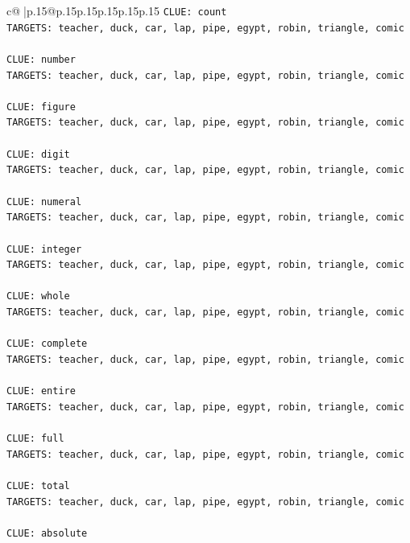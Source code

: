 \documentclass{article}
\begin{document}
{\begin{supertabular}{c@{$\;$}|p{.15\linewidth}@{}p{.15\linewidth}p{.15\linewidth}p{.15\linewidth}p{.15\linewidth}p{.15\linewidth}}
{{{\texttt{CLUE: count} \\
\texttt{TARGETS: teacher, duck, car, lap, pipe, egypt, robin, triangle, comic} \\
\\ 
\texttt{CLUE: number} \\
\texttt{TARGETS: teacher, duck, car, lap, pipe, egypt, robin, triangle, comic} \\
\\ 
\texttt{CLUE: figure} \\
\texttt{TARGETS: teacher, duck, car, lap, pipe, egypt, robin, triangle, comic} \\
\\ 
\texttt{CLUE: digit} \\
\texttt{TARGETS: teacher, duck, car, lap, pipe, egypt, robin, triangle, comic} \\
\\ 
\texttt{CLUE: numeral} \\
\texttt{TARGETS: teacher, duck, car, lap, pipe, egypt, robin, triangle, comic} \\
\\ 
\texttt{CLUE: integer} \\
\texttt{TARGETS: teacher, duck, car, lap, pipe, egypt, robin, triangle, comic} \\
\\ 
\texttt{CLUE: whole} \\
\texttt{TARGETS: teacher, duck, car, lap, pipe, egypt, robin, triangle, comic} \\
\\ 
\texttt{CLUE: complete} \\
\texttt{TARGETS: teacher, duck, car, lap, pipe, egypt, robin, triangle, comic} \\
\\ 
\texttt{CLUE: entire} \\
\texttt{TARGETS: teacher, duck, car, lap, pipe, egypt, robin, triangle, comic} \\
\\ 
\texttt{CLUE: full} \\
\texttt{TARGETS: teacher, duck, car, lap, pipe, egypt, robin, triangle, comic} \\
\\ 
\texttt{CLUE: total} \\
\texttt{TARGETS: teacher, duck, car, lap, pipe, egypt, robin, triangle, comic} \\
\\ 
\texttt{CLUE: absolute} \\
}}}
\end{supertabular}}
\end{document}
